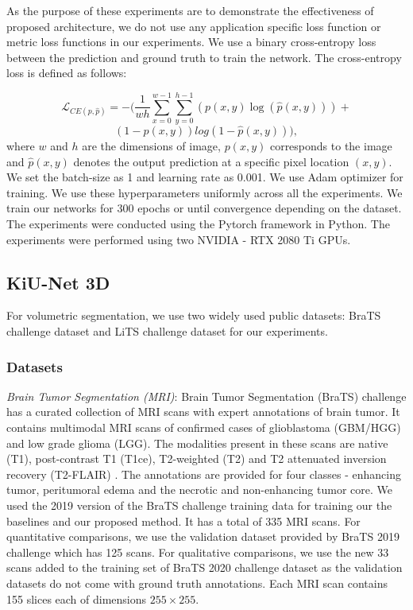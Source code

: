 \documentclass[journal,twoside,web]{ieeecolor}
\begin{document}
As the purpose of these experiments are to demonstrate the effectiveness of  proposed architecture, we do not use any application specific loss function or metric loss functions in our experiments. We use a binary cross-entropy loss between the prediction and ground truth to train the network.  The cross-entropy loss is defined as follows:

\setlength{\belowdisplayskip}{0pt} \setlength{\belowdisplayshortskip}{0pt}
\setlength{\abovedisplayskip}{0pt} \setlength{\abovedisplayshortskip}{0pt}

\[\mathcal{L}_{CE(p,\hat{p})} = - (\frac{1}{wh} \sum_{x=0}^{w-1}\sum_{y=0}^{h-1}(p(x,y) \log(\hat{p}(x,y)) ) + \]
\[(1-p(x,y))log(1-\hat{p}(x,y))),\]
where $w$ and $h$ are the dimensions of image,  $p(x,y)$ corresponds to the image and  $\hat{p}(x,y)$ denotes the output prediction at a specific pixel location $(x,y)$. We set the batch-size as 1 and learning rate as 0.001. We use Adam optimizer for training.   We use these hyperparameters uniformly across all the experiments. We train our networks for 300 epochs or until convergence depending on the dataset. The experiments were conducted using the Pytorch framework in Python. The experiments were performed using two NVIDIA - RTX 2080 Ti GPUs.




\subsection{KiU-Net 3D}

For volumetric segmentation, we use two widely used public datasets: BraTS challenge dataset and LiTS challenge dataset for our experiments.

\subsubsection{Datasets}

\noindent\textit{Brain Tumor Segmentation (MRI)}: Brain Tumor Segmentation (BraTS) challenge has a curated collection of MRI scans with expert annotations of brain tumor. It contains multimodal MRI scans of confirmed cases of glioblastoma (GBM/HGG) and low grade glioma (LGG). The modalities present in these scans are native (T1), post-contrast T1 (T1ce), T2-weighted (T2) and T2 attenuated inversion recovery (T2-FLAIR) \cite{menze2014multimodal,bakas2017advancing,bakas2018identifying}. The annotations are provided for four classes - enhancing tumor, peritumoral edema and the necrotic and non-enhancing tumor core. We used the 2019 version of the BraTS challenge training data for training our the baselines and our proposed method. It has a total of 335 MRI scans. For quantitative comparisons, we use the validation dataset provided by BraTS 2019 challenge which has 125 scans. For qualitative comparisons, we use the new 33 scans added to the  training set of BraTS 2020 challenge dataset as the validation datasets do not come with ground truth annotations. Each MRI scan contains 155 slices each of dimensions $255 \times 255$.  \\
\end{document}
